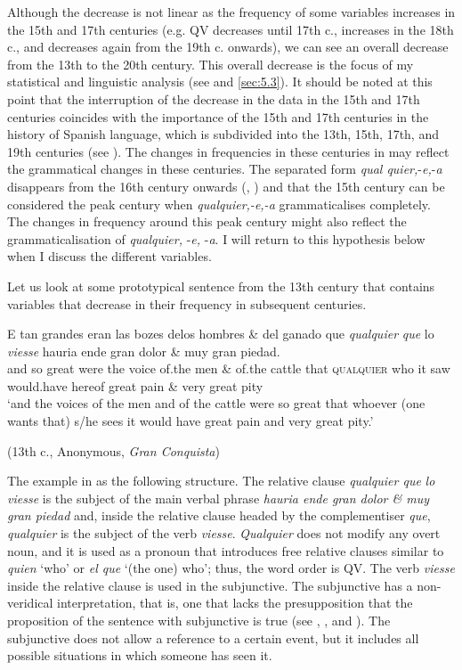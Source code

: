 Although the decrease is not linear as the frequency of some variables increases in the 15th and 17th centuries (e.g. QV decreases until 17th c., increases in the 18th c., and decreases again from the 19th c. onwards), we can see an overall decrease from the 13th to the 20th century. This overall decrease is the focus of my statistical and linguistic analysis (see  and \ref{sec:5.3}). It should be noted at this point that the interruption of the decrease in the data in the 15th and 17th centuries coincides with the importance of the 15th and 17th centuries in the history of Spanish language, which is subdivided into the 13th, 15th, 17th, and 19th centuries (see ). The changes in frequencies in these centuries in  may reflect the grammatical changes in these centuries. The separated form \textit{qual quier,}-\textit{e,}-\textit{a} disappears from the 16th century onwards (\citealt{Pato2012}, ) and that the 15th century can be considered the peak century when \textit{qualquier,-e,-a} grammaticalises completely. The changes in frequency around this peak century might also reflect the grammaticalisation of \textit{qualquier,} -\textit{e,} -\textit{a}. I will return to this hypothesis below when I discuss the different variables.

Let us look at some prototypical sentence from the 13th century that contains variables that decrease in their frequency in subsequent centuries.

\ea \label{ex:key:279} %
  \gll E tan grandes eran las bozes delos hombres \& del ganado que \textit{qualquier} \textit{que} lo \textit{viesse} hauria ende gran dolor \& muy gran piedad.\\
and so great were the voice of.the men \& of.the cattle that \textsc{qualquier} who it saw would.have hereof great pain \& very great pity\\
  \glt ‘and the voices of the men and of the cattle were so great that whoever (one wants that) s/he sees it would have great pain and very great pity.’

  (13th c., Anonymous, \textit{Gran Conquista})
\z

The example in  as the following structure. The relative clause \textit{qualquier que} \textit{lo viesse} is the subject of the main verbal phrase \textit{hauria ende gran dolor \& muy gran piedad} and, inside the relative clause headed by the complementiser \textit{que}, \textit{qualquier} is the subject of the verb \textit{viesse}. \textit{Qualquier} does not modify any overt noun, and it is used as a pronoun that introduces free relative clauses similar to \textit{quien} ‘who’ or \textit{el que} ‘(the one) who’; thus, the word order is QV. The verb \textit{viesse} inside the relative clause is used in the subjunctive. The subjunctive has a non-veridical interpretation, that is, one that lacks the presupposition that the proposition of the sentence with subjunctive is true (see \citealt{Quer1998,Quer2000}, \citealt{Becker2014}, and ). The subjunctive does not allow a reference to a certain event, but it includes all possible situations in which someone has seen it.


